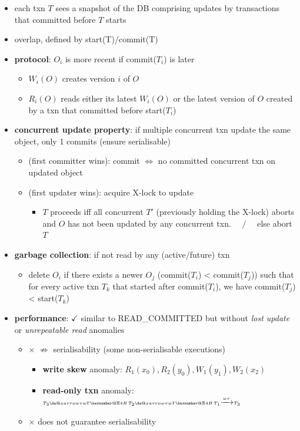 \documentclass[10pt, landscape]{article}
\makeatletter
\newcommand*{\xdashrightarrow}[2][]{%
  \mathrel{%
    \mathpalette{\da@xarrow{#1}{#2}{}\da@rightarrow{\,}{}}{}%
  }%
}
\newcommand*{\da@rightarrow}{\mathchar"0\hexnumber@\symAMSa 4B }
\newcommand*{\da@xarrow}[7]{%
  \sbox0{$\ifx#7\scriptstyle\scriptscriptstyle\else\scriptstyle\fi#5#1#6\m@th$}%
  \sbox2{$\ifx#7\scriptstyle\scriptscriptstyle\else\scriptstyle\fi#5#2#6\m@th$}%
  \sbox4{$#7\dabar@\m@th$}%
  \dimen@=\wd0 %
  \ifdim\wd2 >\dimen@
    \dimen@=\wd2 %
  \fi
  \count@=2 %
  \def\da@bars{\dabar@\dabar@}%
  \@whiledim\count@\wd4<\dimen@\do{%
    \advance\count@\@ne
    \expandafter\def\expandafter\da@bars\expandafter{%
      \da@bars
      \dabar@ 
    }%
  }%
  \mathrel{#3}%
  \mathrel{%
    \mathop{\da@bars}\limits
    \ifx\\#1\\%
  \else
    _{\copy0}%
  \fi
  \ifx\\#2\\%
\else
  ^{\copy2}%
\fi
}%
\mathrel{#4}%
}
\makeatother
\begin{document}
\begin{multicols*}{4}
  \begin{itemize}
    \item each txn $T$ sees a snapshot of the DB comprising updates by transactions that committed before $T$ starts
    \item {} overlap, defined by start(T)/commit(T)
    \item \textbf{protocol}: $O_i$ is more recent if commit($T_i$) is later
      \begin{itemize}
        \item $W_i(O)$ creates version $i$ of $O$ 
        \item $R_i(O)$ reads either its latest $W_i(O)$ or the latest version of $O$ created by a txn that committed before start($T_i$)
      \end{itemize}
    \item \textbf{concurrent update property}: if multiple concurrent txn update the same object, only 1 commits (ensure serialisable)
      \begin{itemize}
        \item {} (first committer wins): commit $\iff$ no committed concurrent txn on updated object
        \item {} (first updater wins): acquire X-lock to update
          \begin{itemize}
            \item $T$ proceeds iff all concurrent $T'$ (previously holding the X-lock) aborts and $O$ has not been updated by any concurrent txn. $\quad/\quad$ else abort $T$
          \end{itemize}
      \end{itemize}
    \item \textbf{garbage collection}: if not read by any (active/future) txn
      \begin{itemize}
        \item delete $O_i$ if there exists a newer $O_j$ (commit($T_i$) < commit($T_j$)) such that for every active txn $T_k$ that started after commit($T_i$),  we have commit($T_j$) < start($T_k$)
      \end{itemize}
    \item \textbf{performance}: $\checkmark$ similar to READ\_COMMITTED but without \textit{lost update} or \textit{unrepeatable read} anomalies
      \begin{itemize}
        \item $\times$ $\not\Rightarrow$ serialisability (some non-serialisable executions)
          \begin{itemize}
            \item \textbf{write skew} anomaly: $\scriptscriptstyle R_1(x_0), R_2(y_0), W_1(y_1), W_2(x_2)$
            \item \textbf{read-only txn} anomaly: $\scriptscriptstyle T_3 \xdashrightarrow{rw} T_2 \xdashrightarrow{rw} T_1 \xrightarrow{wr} T_3$
          \end{itemize}
        \item $\times$ does not guarantee serialisability
      \end{itemize}
  \end{itemize}


\end{multicols*}
\end{document}
